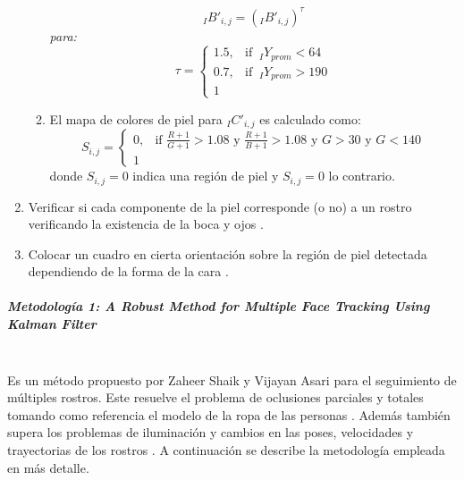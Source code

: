 \documentclass[a4paper,openright,12pt]{report}
\begin{document}
\begin{enumerate}[label=(\alph*)]
\begin{framed}
\begin{enumerate}[label=\arabic*.]
\[                    {}_{I}B'_{i,j} = ({}_{I}B'_{i,j})^\tau
                \]
                \textit{para:}
                \begin{equation}
                    \tau=
                    \begin{cases}
                        1.5, & \text{if }\ {}_{I}Y_{prom}<64\\
                        0.7, & \text{if }\ {}_{I}Y_{prom}>190\\
                        1
                    \end{cases}
                \end{equation}
            \item El mapa de colores de piel para ${}_{I}C'_{i,j}$ es calculado
                como:
                \begin{equation}
                    S_{i,j}=
                    \begin{cases}
                        0, & \text{if $\frac{R + 1}{G + 1}>1.08$ y $\frac{R + 1}{B + 1}>1.08$ y $G>30$ y $G<140$}\\
                        1
                    \end{cases}
                \end{equation}
                donde $S_{i,j}=0$ indica una región de piel y $S_{i,j}=0$ lo contrario.
        \end{enumerate}
        \raggedleft\cite{sarkar2012real}
    \end{framed}

    \item Verificar si cada componente de la piel corresponde (o no) a un
        rostro verificando la existencia de la boca y ojos \cite{sarkar2012real}.
    \item Colocar un cuadro en cierta orientación sobre la región de piel
        detectada dependiendo de la forma de la cara \cite{sarkar2012real}.
\end{enumerate}

\subparagraph{Metodología 1:
              A Robust Method for Multiple Face Tracking Using Kalman Filter}\mbox{} \\

Es un método propuesto por Zaheer Shaik y Vijayan Asari para el seguimiento de
múltiples rostros. Este resuelve el problema de oclusiones parciales y totales 
tomando como referencia el modelo de la ropa de las personas \cite{shaik2007robust}. Además también
supera los problemas de iluminación y cambios en las poses, velocidades y
trayectorias de los rostros \cite{shaik2007robust}. A continuación se describe la metodología empleada 
en más detalle.\\
\end{document}
